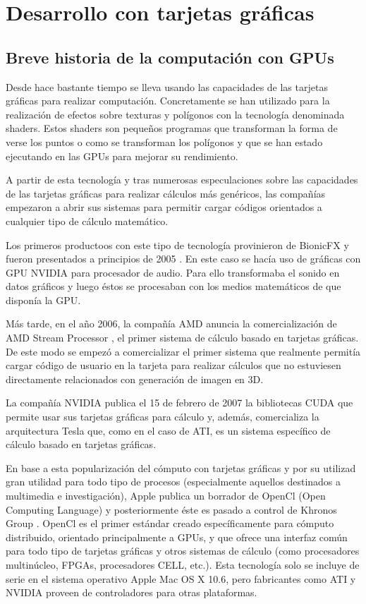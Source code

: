 \chapter{Desarrollo con tarjetas gráficas}

\section{Breve historia de la computación con GPUs}

Desde hace bastante tiempo se lleva usando las capacidades de las tarjetas gráficas para realizar computación. Concretamente se han utilizado para la realización de efectos sobre texturas y polígonos con la tecnología denominada shaders. Estos shaders son pequeños programas que transforman la forma de verse los puntos o como se transforman los polígonos y que se han estado ejecutando en las GPUs para mejorar su rendimiento.

A partir de esta tecnología y tras numerosas especulaciones sobre las capacidades de las tarjetas gráficas para realizar cálculos más genéricos, las compañías empezaron a abrir sus sistemas para permitir cargar códigos orientados a cualquier tipo de cálculo matemático.

Los primeros productoos con este tipo de tecnología provinieron de BionicFX y fueron presentados a principios de 2005 \cite{website:extremetech_gpu_audio}. En este caso se hacía uso de gráficas con GPU NVIDIA para procesador de audio. Para ello transformaba el sonido en datos gráficos y luego éstos se procesaban con los medios matemáticos de que disponía la GPU.

Más tarde, en el año 2006, la compañía AMD anuncia la comercialización de AMD Stream Processor \cite{website:amd_press_stream}, el primer sistema de cálculo basado en tarjetas gráficas. De este modo se empezó a comercializar el primer sistema que realmente permitía cargar código de usuario en la tarjeta para realizar cálculos que no estuviesen directamente relacionados con generación de imagen en 3D.

La compañía NVIDIA publica el 15 de febrero de 2007 la bibliotecas CUDA \cite{website:nvidia_press_cuda} que permite usar sus tarjetas gráficas para cálculo y, además, comercializa la arquitectura Tesla que, como en el caso de ATI, es un sistema específico de cálculo basado en tarjetas gráficas.

En base a esta popularización del cómputo con tarjetas gráficas y por  su utilizad gran utilidad para todo tipo de procesos (especialmente aquellos destinados a multimedia e investigación), Apple publica un borrador de OpenCl (Open Computing Language) y posteriormente éste es pasado a control de Khronos Group \cite{website:khronos_press_opencl}. OpenCl es  el primer estándar creado específicamente para cómputo distribuido, orientado principalmente a GPUs, y que ofrece una interfaz común para todo tipo de tarjetas gráficas y otros sistemas de cálculo (como procesadores multinúcleo, FPGAs, procesadores CELL, etc.). Esta tecnología solo se incluye de serie en el sistema operativo Apple Mac OS X 10.6, pero fabricantes como ATI y NVIDIA proveen de controladores para otras plataformas.


